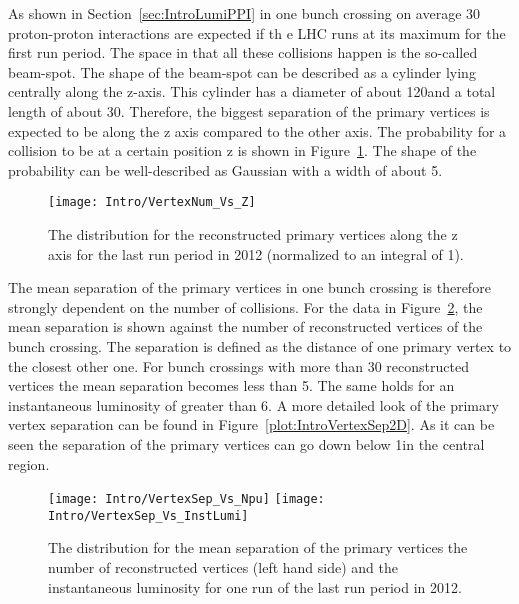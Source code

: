 As shown in Section~\ref{sec:IntroLumiPPI} in one bunch crossing on average 30 proton-proton interactions are expected if th e LHC runs at its maximum for the first run period. The space in that all these collisions happen is the so-called beam-spot. The shape of the beam-spot can be described as a cylinder lying centrally along the z-axis. This cylinder has a diameter of about 120\mum and a total length of about 30\cm. Therefore, the biggest separation of the primary vertices is expected to be along the z axis compared to the other axis. The probability for a collision to be at a certain position z is shown in Figure~\ref{plot:IntroVertexPos}. The shape of the probability can be well-described as Gaussian with a width of about 5\cm.

\begin{figure}[!Hhtb]
    \centering
    \texttt{[image: Intro/VertexNum\_Vs\_Z]}
    \caption[Vertex distribution along z]{The distribution for the reconstructed primary vertices along the z axis for the last run period in 2012 (normalized to an integral of 1). \label{plot:IntroVertexPos}}
\end{figure}

The mean separation of the primary vertices in one bunch crossing is therefore strongly dependent on the number of collisions. For the data in Figure~\ref{plot:IntroVertexSep}, the mean separation is shown against the number of reconstructed vertices of the bunch crossing. The separation is defined as the distance of one primary vertex to the closest other one. For bunch crossings with more than 30 reconstructed vertices the mean separation becomes less than 5\mm. The same holds for an instantaneous luminosity of greater than 6\hertzpernbarn. A more detailed look of the primary vertex separation can be found in Figure~\ref{plot:IntroVertexSep2D}. As it can be seen the separation of the primary vertices can go down below 1\mm in the central region.

\begin{figure}[!Hhtb]
    \centering
    \texttt{[image: Intro/VertexSep\_Vs\_Npu]}
    \texttt{[image: Intro/VertexSep\_Vs\_InstLumi]}
    \caption[Mean vertex separation \vs number of reconstructed vertices and \vs instantaneous luminosity]{The distribution for the mean separation of the primary vertices \vs the number of reconstructed vertices (left hand side) and \vs the instantaneous luminosity for one run of the last run period in 2012. \label{plot:IntroVertexSep}}
\end{figure}

